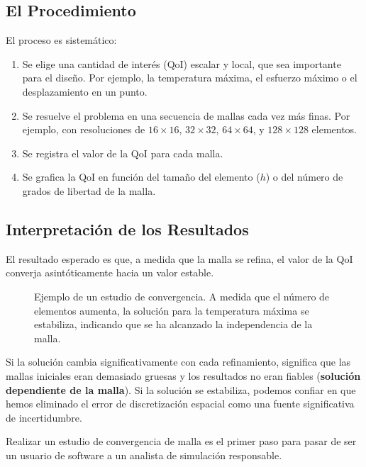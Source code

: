\subsection{El Procedimiento}
El proceso es sistemático:
\begin{enumerate}
    \item Se elige una cantidad de interés (QoI) escalar y local, que sea importante para el diseño. Por ejemplo, la temperatura máxima, el esfuerzo máximo o el desplazamiento en un punto.
    \item Se resuelve el problema en una secuencia de mallas cada vez más finas. Por ejemplo, con resoluciones de \(16\times16\), \(32\times32\), \(64\times64\), y \(128\times128\) elementos.
    \item Se registra el valor de la QoI para cada malla.
    \item Se grafica la QoI en función del tamaño del elemento (\(h\)) o del número de grados de libertad de la malla.
\end{enumerate}

\subsection{Interpretación de los Resultados}
El resultado esperado es que, a medida que la malla se refina, el valor de la QoI converja asintóticamente hacia un valor estable.

\begin{figure}[h!]
    \centering
    \caption{Ejemplo de un estudio de convergencia. A medida que el número de elementos aumenta, la solución para la temperatura máxima se estabiliza, indicando que se ha alcanzado la independencia de la malla.}
    \label{fig:mesh-convergence}
\end{figure}

Si la solución cambia significativamente con cada refinamiento, significa que las mallas iniciales eran demasiado gruesas y los resultados no eran fiables (\textbf{solución dependiente de la malla}). Si la solución se estabiliza, podemos confiar en que hemos eliminado el error de discretización espacial como una fuente significativa de incertidumbre.

Realizar un estudio de convergencia de malla es el primer paso para pasar de ser un usuario de software a un analista de simulación responsable.